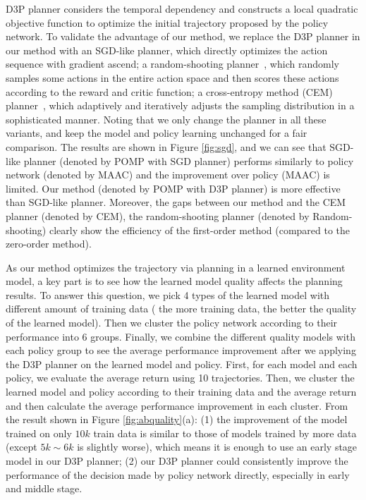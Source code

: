 \documentclass{article}
\newcommand{\yue}[1]{ {#1}}
\newcommand{\revision}[1]{{#1}}
\begin{document}
\revision{\noindent{\bf Is our D3P planner advantageous in continuous control? }} D3P planner considers the temporal dependency and constructs a local quadratic objective function to optimize the initial trajectory proposed by the policy network. To validate the advantage of our method, we replace the D3P planner in our method with an SGD-like planner, which directly optimizes the action sequence with gradient ascend; \revision{a random-shooting planner~, which randomly samples some actions in the entire action space and then scores these actions according to the reward and critic function; a cross-entropy method (CEM) planner~, which adaptively and iteratively adjusts the sampling distribution in a  sophisticated manner. Noting that we only change the planner in all these variants, and keep the model and policy learning unchanged for a fair comparison.} The results are shown in Figure \ref{fig:sgd}, and we can see that SGD-like planner (denoted by POMP with SGD planner) performs similarly to policy network (denoted by MAAC) and the improvement over policy (MAAC) is limited. Our method (denoted by POMP with D3P planner) is more effective than  SGD-like planner. \revision{Moreover, the gaps between our method and the CEM planner (denoted by CEM), the random-shooting planner (denoted by Random-shooting) clearly show the efficiency of the first-order method (compared to the zero-order method).}

 As our method optimizes the trajectory via planning in a learned environment model, a key part is to see how the learned model quality affects the planning results. To answer this question, we pick 4 types of the learned model with different amount of training data ( the more training data, the better the quality of the learned model). Then we cluster the policy network according to their performance into 6 groups. Finally, we combine the different quality models with each policy group to see the average performance improvement after we applying the D3P planner on the learned model and policy. \yue{First, for each model and each policy, we  evaluate the average return using 10 trajectories. Then, we cluster the learned model and policy according to their training data and the average return and then calculate the average performance improvement in each cluster}. From the result shown in Figure \ref{fig:abquality}(a): (1) the improvement of the model trained on only  $10k$ train data is similar to those of models trained by more data (except $5k{\sim}6k$ is slightly worse), which means it is enough to use an early stage model in our D3P planner; (2) our D3P planner could consistently improve the performance of the decision  made by policy network directly, especially in early and middle stage.
\end{document}
